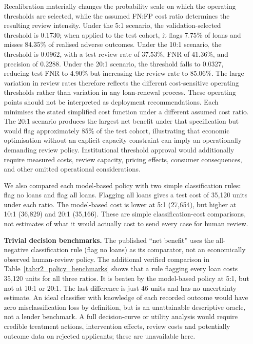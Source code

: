 \documentclass[10pt]{article}
\begin{document}
Recalibration materially changes the probability scale on which the operating thresholds are selected, while the assumed FN:FP cost ratio determines the resulting review intensity. Under the 5:1 scenario, the validation-selected threshold is 0.1730; when applied to the test cohort, it flags 7.75\% of loans and misses 84.35\% of realised adverse outcomes. Under the 10:1 scenario, the threshold is 0.0962, with a test review rate of 37.53\%, FNR of 41.36\%, and precision of 0.2288. Under the 20:1 scenario, the threshold falls to 0.0327, reducing test FNR to 4.90\% but increasing the review rate to 85.06\%. The large variation in review rates therefore reflects the different cost-sensitive operating thresholds rather than variation in any loan-renewal process. These operating points should not be interpreted as deployment recommendations. Each minimises the stated simplified cost function under a different assumed cost ratio. The 20:1 scenario produces the largest net benefit under that specification but would flag approximately 85\% of the test cohort, illustrating that economic optimisation without an explicit capacity constraint can imply an operationally demanding review policy. Institutional threshold approval would additionally require measured costs, review capacity, pricing effects, consumer consequences, and other omitted operational considerations.

We also compared each model-based policy with two simple classification rules: flag no loans and flag all loans. Flagging all loans gives a test cost of 35,120 units under each ratio. The model-based cost is lower at 5:1 (27,654), but higher at 10:1 (36,829) and 20:1 (35,166). These are simple classification-cost comparisons, not estimates of what it would actually cost to send every case for human review.


\noindent\textbf{Trivial decision benchmarks.} The published ``net benefit'' uses the all-negative classification rule (flag no loans) as its comparator, not an economically observed human-review policy. The additional verified comparison in Table~\ref{tab:r2_policy_benchmarks} shows that a rule flagging every loan costs 35,120 units for all three ratios. It is beaten by the model-based policy at 5:1, but not at 10:1 or 20:1. The last difference is just 46 units and has no uncertainty estimate. An ideal classifier with knowledge of each recorded outcome would have zero misclassification loss by definition, but is an unattainable descriptive oracle, not a lender benchmark. A full decision-curve or utility analysis would require credible treatment actions, intervention effects, review costs and potentially outcome data on rejected applicants; these are unavailable here.
\end{document}
